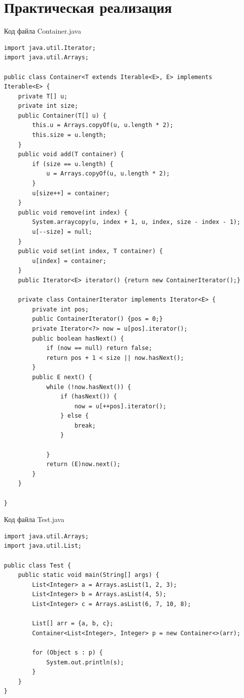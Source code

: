 \documentclass[a4paper, 14pt]{extarticle}
\begin{document}
\pagebreak
\section{Практическая реализация}
Код файла Container.java
\begin{lstlisting}
import java.util.Iterator;
import java.util.Arrays;

public class Container<T extends Iterable<E>, E> implements Iterable<E> {
    private T[] u;
    private int size;
    public Container(T[] u) {
        this.u = Arrays.copyOf(u, u.length * 2);
        this.size = u.length;
    }
    public void add(T container) {
        if (size == u.length) {
            u = Arrays.copyOf(u, u.length * 2);
        }
        u[size++] = container;
    }
    public void remove(int index) {
        System.arraycopy(u, index + 1, u, index, size - index - 1);
        u[--size] = null;
    }
    public void set(int index, T container) {
        u[index] = container;
    }
    public Iterator<E> iterator() {return new ContainerIterator();}

    private class ContainerIterator implements Iterator<E> {
        private int pos;
        public ContainerIterator() {pos = 0;}
        private Iterator<?> now = u[pos].iterator();
        public boolean hasNext() {
            if (now == null) return false;
            return pos + 1 < size || now.hasNext();
        }
        public E next() {
            while (!now.hasNext()) {
                if (hasNext()) {
                    now = u[++pos].iterator();
                } else {
                    break;
                }

            }
            return (E)now.next();
        }
    }

}
\end{lstlisting}
\par
Код файла Test.java
\begin{lstlisting}
import java.util.Arrays;
import java.util.List;

public class Test {
    public static void main(String[] args) {
        List<Integer> a = Arrays.asList(1, 2, 3);
        List<Integer> b = Arrays.asList(4, 5);
        List<Integer> c = Arrays.asList(6, 7, 10, 8);

        List[] arr = {a, b, c};
        Container<List<Integer>, Integer> p = new Container<>(arr);

        for (Object s : p) {
            System.out.println(s);
        }
    }
}
\end{lstlisting}
\par
\end{document}
